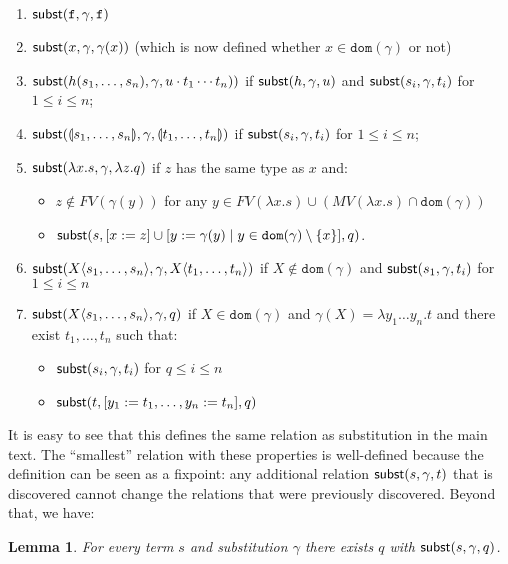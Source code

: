 \documentclass{lmcs}
\theoremstyle{theorem}\newtheorem{theorem}{Theorem}
\theoremstyle{theorem}\newtheorem{lemma}[theorem]{Lemma}
\theoremstyle{theorem}\newtheorem{corollary}[theorem]{Corollary}
\theoremstyle{definition}\newtheorem{definition}[theorem]{Definition}
\theoremstyle{definition}\newtheorem{example}[theorem]{Example}
\newcommand{\FV}{\mathit{FV}}
\newcommand{\FMV}{\mathit{MV}}
\newcommand{\domain}{\mathtt{dom}}
\newcommand{\identifier}[1]{\mathtt{#1}}
\newcommand{\afun}{\identifier{f}}
\newcommand{\avar}{x}
\newcommand{\bvar}{y}
\newcommand{\cvar}{z}
\newcommand{\Avar}{X}
\newcommand{\abs}[2]{\lambda #1.#2}
\newcommand{\meta}[2]{#1\langle#2\rangle}
\newcommand{\tuple}[2]{\llparenthesis #1,\dots,#2 \rrparenthesis}
\begin{document}
\begin{enumerate}
\item\label{subst:func} $\subrel{\afun,\gamma,\afun}$
\item\label{subst:var} $\subrel{\avar,\gamma,\gamma(\avar)}$ (which is now
  defined whether $\avar \in \domain(\gamma)$ or not)
\item\label{subst:appl} $\mathsf{subst}(h(s_1,\dots,s_n), \gamma, u \cdot t_1 \cdots
  t_n))$ if $\mathsf{subst}(h,\gamma,u)$ and $\mathsf{subst}(s_i,\gamma,t_i)$ for
  $1 \leq i \leq n$;
\item\label{subst:tuple} $\subrel{\tuple{s_1}{s_n},\gamma,\tuple{t_1}{t_n}}$ if
  $\mathsf{subst}(s_i,\gamma,t_i)$ for $1 \leq i \leq n$;
\item\label{subst:abs} $\subrel{\abs{\avar}{s},\gamma,\abs{\cvar}{q}}$ if
  $\cvar$ has the same type as $\avar$ and:
  \begin{itemize}
  \item $\cvar \notin \FV(\gamma(\bvar))$ for any $\bvar \in
    \FV(\abs{\avar}{s}) \cup (\FMV(\abs{\avar}{s}) \cap \domain(\gamma))$
  \item $\subrel{s,[\avar:=\cvar] \cup [\bvar := \gamma(\bvar) \mid \bvar \in
    \domain(\gamma) \setminus \{\avar\}],q}$.
  \end{itemize}
\item\label{subst:boringmeta} $\subrel{\meta{\Avar}{s_1,\dots,s_n},\gamma,
  \meta{\Avar}{t_1,\dots,t_n}}$ if $\Avar \notin \domain(\gamma)$ and
  $\mathsf{subst}(s_1,\gamma,t_i)$ for $1 \leq i \leq n$
\item\label{subst:meta} $\subrel{\meta{\Avar}{s_1,\dots,s_n},\gamma,q}$ if
  $\Avar \in \domain(\gamma)$ and $\gamma(\Avar) = \abs{\bvar_1 \dots \bvar_n}{
  t}$ and there exist $t_1,\dots,t_n$ such that:
  \begin{itemize}
  \item $\mathsf{subst}(s_i,\gamma,t_i)$ for $q \leq i \leq n$
  \item $\subrel{t,[\bvar_1:=t_1,\dots,\bvar_n:=t_n],q}$
  \end{itemize}
\end{enumerate}
It is easy to see that this defines the same relation as substitution in the
main text.  The ``smallest'' relation with these properties is well-defined
because the definition can be seen as a fixpoint: any additional relation
$\mathsf{subst}(s,\gamma,t)$ that is discovered cannot change the relations that were
previously discovered.
Beyond that, we have:

\begin{lemma}\label{lem:substdefined}
For every term $s$ and substitution $\gamma$ there exists $q$ with
$\mathsf{subst}(s,\gamma,q)$.
\end{lemma}
\end{document}
